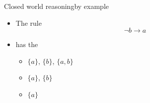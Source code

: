 \begin{frame}{Closed world reasoning}{by example}
  \bigskip
  \begin{itemize}
  \item The rule
    \[
      \neg b\to a
    \]
  \item[] has the
    \par\smallskip
    \begin{itemize}\normalsize
    \item {}         $\{a\}$, $\{b\}$, $\{a,b\}$
      \smallskip
    \item {} $\{a\}$, $\{b\}$
      \smallskip
    \item {}  $\{a\}$
    \end{itemize}
  \end{itemize}
\end{frame}
%
